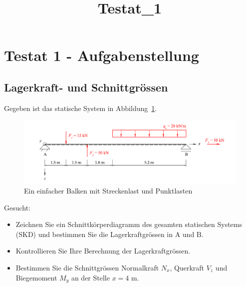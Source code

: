 \documentclass[
  12pt,
  letterpaper,
  DIV=11,
  egregdoesnotlikesansseriftitles]{scrartcl}
\title{Testat\_1}
\author{}
\date{}
\providecommand{\tightlist}{%
  \setlength{\itemsep}{0pt}\setlength{\parskip}{0pt}}\usepackage{longtable,booktabs,array}
\renewcommand{\maketitle}{}
\begin{document}
\maketitle
\ifdefined\Shaded\renewenvironment{Shaded}{\begin{tcolorbox}[boxrule=0pt, enhanced, interior hidden, borderline west={3pt}{0pt}{shadecolor}, breakable, sharp corners, frame hidden]}{\end{tcolorbox}}\fi

\hypertarget{testat-1---aufgabenstellung}{%
\section{Testat 1 -
Aufgabenstellung}\label{testat-1---aufgabenstellung}}

\hypertarget{lagerkraft--und-schnittgruxf6ssen}{%
\subsection{Lagerkraft- und
Schnittgrössen}\label{lagerkraft--und-schnittgruxf6ssen}}

Gegeben ist das statische System in Abbildung~\ref{fig-system}.

\begin{figure}[H]

{\centering \includegraphics{BSI_HS23_Testat_01_files/mediabag/../images/Testat_01_HS23.pdf}

}

\caption{\label{fig-system}Ein einfacher Balken mit Streckenlast und
Punktlasten}

\end{figure}

Gesucht:

\begin{itemize}
\tightlist
\item
  Zeichnen Sie ein Schnittkörperdiagramm des gesamten statischen Systems
  (SKD) und bestimmen Sie die Lagerkraftgrössen in \(\text{A}\) und
  \(\text{B}\).
\item
  Kontrollieren Sie Ihre Berechnung der Lagerkraftgrössen.
\item
  Bestimmen Sie die Schnittgrössen Normalkraft \(N_x\), Querkraft
  \(V_z\) und Biegemoment \(M_y\) an der Stelle \(x=4\) m.
\end{itemize}
\end{document}
